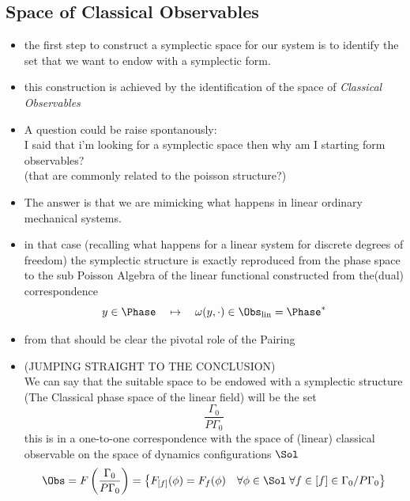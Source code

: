 \documentclass[a4paper,11pt]{scrartcl}
\begin{document}
    \subsection{Space of Classical Observables}
    \begin{itemize}
        \item the first step to construct a symplectic space for our system is to identify the set that we want to endow with a symplectic form.
        \item this construction is achieved by the identification of the space of \emph{Classical Observables}
        \item A question could be raise spontanously:\\
        I said that i'm looking for a symplectic space then why am I starting form observables? \\
        (that are commonly related to the poisson structure?)
        \item The answer is that we are mimicking what happens in linear ordinary mechanical systems.
        \item in that case (recalling what happens for a linear system for discrete degrees of freedom) the symplectic structure is exactly reproduced from the phase space to the sub Poisson Algebra of the linear functional constructed from the(dual) correspondence
        $$ y \in \Phase \quad \mapsto \quad \omega(y,\cdot) \in \Obs_{\textrm{lin}} = \Phase^* $$
        \item from that should be clear the pivotal role of the Pairing
        \item (JUMPING STRAIGHT TO THE CONCLUSION)\\
        We can say that the suitable space to be endowed with a symplectic structure (The Classical phase space of the linear field)
        will be the set
        $$\frac{\Gamma_0}{P\Gamma_0} $$
        this is in a one-to-one correspondence with the space of (linear) classical observable on the space of dynamics configurations $\Sol$
        $$ \Obs = F\left( \frac{\Gamma_0}{P\Gamma_0}  \right) =\left\{ F_{[f]}(\phi) = F_f(\phi) \quad \forall \phi \in \Sol \; \forall f \in [f] \in \Gamma_0/P\Gamma_0 \right\} $$
    \end{itemize}
\end{document}
